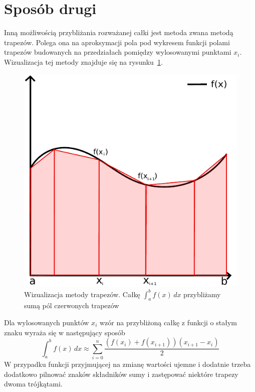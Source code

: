 \documentclass[11pt,wide,leqno]{article}
\begin{document}
    \section{Sposób drugi}
        Inną możliwością przybliżania rozważanej całki jest metoda zwana metodą trapezów. Polega ona 
        na aproksymacji pola pod wykresem funkcji polami trapezów budowanych na przedziałach pomiędzy wylosowanymi punktami \(x_i\).
        Wizualizacja tej metody znajduje się na rysunku~\ref{trapezy}.

        \begin{figure}[h]
            \centering
            \includegraphics[scale=0.75]{../prog/bitmap.pdf}
            \caption{Wizualizacja metody trapezów. Całkę \(\int_{a}^{b} f(x)\,dx\) przybliżamy sumą
            pól czerwonych trapezów}\label{trapezy}
        \end{figure}

        Dla wylosowanych punktów \(x_i\) wzór na przybliżoną całkę z funkcji o stałym znaku wyraża się w następujący sposób
        \begin{equation}
            \int_{a}^{b} f(x)\,dx \approx \sum_{i=0}^{n} \frac{(f(x_i) + f(x_{i+1}))(x_{i+1}-x_i)}{2}
        \end{equation}
        W przypadku funkcji przyjmującej na zmianę wartości ujemne i dodatnie trzeba dodatkowo pilnować
        znaków składników sumy i zastępować niektóre trapezy dwoma trójkątami.
\end{document}
